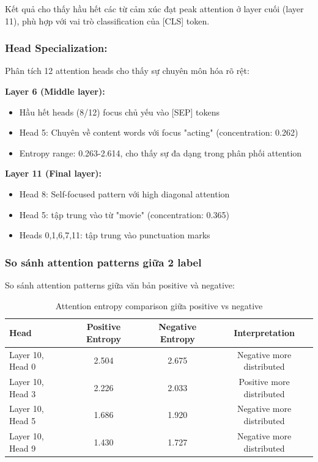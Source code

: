 Kết quả cho thấy hầu hết các từ cảm xúc đạt peak attention ở layer cuối (layer 11), phù hợp với vai trò classification của [CLS] token.

\subsubsection{Head Specialization:}

Phân tích 12 attention heads cho thấy sự chuyên môn hóa rõ rệt:

\textbf{Layer 6 (Middle layer):}
\begin{itemize}
    \item Hầu hết heads (8/12) focus chủ yếu vào [SEP] tokens
    \item Head 5: Chuyên về content words với focus "acting" (concentration: 0.262)
    \item Entropy range: 0.263-2.614, cho thấy sự đa dạng trong phân phối attention 
\end{itemize}

\textbf{Layer 11 (Final layer):}
\begin{itemize}
    \item Head 8: Self-focused pattern với high diagonal attention
    \item Head 5: tập trung vào từ "movie" (concentration: 0.365)
    \item Heads 0,1,6,7,11: tập trung vào punctuation marks
\end{itemize}

\subsubsection{So sánh attention patterns giữa 2 label}

So sánh attention patterns giữa văn bản positive và negative:

\begin{table}[H]
\centering
\caption{Attention entropy comparison giữa positive vs negative}
\label{tab:sentiment_attention_comparison}
\begin{tabular}{lccc}
\toprule
\textbf{Head} & \textbf{Positive Entropy} & \textbf{Negative Entropy} & \textbf{Interpretation} \\
\midrule
Layer 10, Head 0 & 2.504 & 2.675 & Negative more distributed \\
Layer 10, Head 3 & 2.226 & 2.033 & Positive more distributed \\
Layer 10, Head 5 & 1.686 & 1.920 & Negative more distributed \\
Layer 10, Head 9 & 1.430 & 1.727 & Negative more distributed \\
\bottomrule
\end{tabular}
\end{table}

